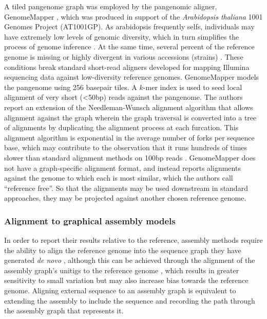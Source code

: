 A tiled pangenome graph was employed by the pangenomic aligner, GenomeMapper \cite{schneeberger2009simultaneous}, which was produced in support of the \emph{Arabidopsis thaliana} 1001 Genomes Project (AT1001GP).
As arabidopsis frequently selfs, individuals may have extremely low levels of genomic diversity, which in turn simplifies the process of genome inference \cite{cao2011whole}.
At the same time, several percent of the reference genome is missing or highly divergent in various accessions (strains) \cite{clark2007common,zeller2008detecting}.
These conditions break standard short-read aligners developed for mapping Illumina sequencing data against low-diversity reference genomes.
GenomeMapper models the pangenome using 256 basepair tiles.
A $k$-mer index is used to seed local alignment of very short (<50bp) reads against the pangenome.
The authors report an extension of the Needleman-Wunsch alignment algorithm that allows alignment against the graph wherein the graph traversal is converted into a tree of alignments by duplicating the alignment process at each furcation.
This alignment algorithm is exponential in the average number of forks per sequence base, which may contribute to the observation that it runs hundreds of times slower than standard alignment methods on 100bp reads \cite{liu2016debga}.
GenomeMapper does not have a graph-specific alignment format, and instead reports alignments against the genome to which each is most similar, which the authors call ``reference free''.
So that the alignments may be used downstream in standard approaches, they may be projected against another chosen reference genome.

\subsubsection{Alignment to graphical assembly models}

In order to report their results relative to the reference, assembly methods require the ability to align the reference genome into the sequence graph they have generated \emph{de novo} \cite{iqbal2012novo,simpson2012efficient}, although this can be achieved through the alignment of the assembly graph's unitigs to the reference genome \cite{li2015fermikit}, which results in greater sensitivity to small variation but may also increase bias towards the reference genome.
Aligning external sequence to an assembly graph is equivalent to extending the assembly to include the sequence and recording the path through the assembly graph that represents it.

